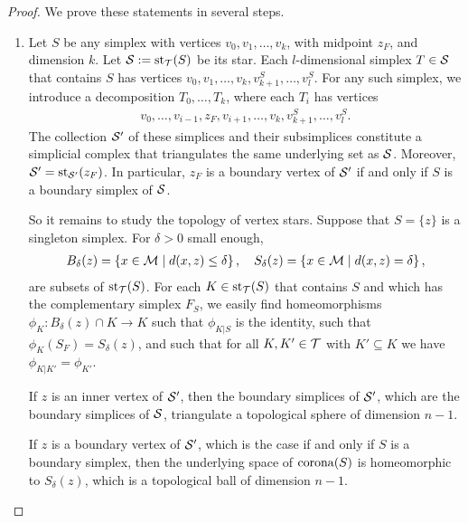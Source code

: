 \documentclass[a4paper]{article}
\begin{document}
\begin{proof}
    We prove these statements in several steps.
    \begin{enumerate}
    \item 
    Let $S$ be any simplex with vertices $v_0, v_1, \dots, v_k$, with midpoint $z_F$, and dimension $k$.
    Let ${\mathcal S} := \operatorname{st}_{{\mathcal T}}(S)$ be its star. 
    Each $l$-dimensional simplex $T \in {\mathcal S}$ that contains $S$ 
    has vertices $v_0, v_1, \dots, v_k, v_{k+1}^{S}, \dots, v_{l}^{S}$. 
    For any such simplex, we introduce a decomposition $T_{0}, \dots, T_{k}$, where each $T_{i}$ has vertices 
    \begin{align*}
        v_0, \dots, v_{i-1}, z_F, v_{i+1}, \dots, v_k, v_{k+1}^{S}, \dots, v_{l}^{S}.
    \end{align*}
    The collection ${\mathcal S}'$ of these simplices and their subsimplices constitute a simplicial complex 
    that triangulates the same underlying set as ${\mathcal S}$.
    Moreover, ${\mathcal S}' = \operatorname{st}_{{\mathcal S}'}(z_F)$. 
    In particular, $z_F$ is a boundary vertex of ${\mathcal S}'$ if and only if $S$ is a boundary simplex of ${\mathcal S}$. 
    
    So it remains to study the topology of vertex stars. Suppose that $S = \{z\}$ is a singleton simplex. 
    For $\delta > 0$ small enough, 
    \begin{align*}
        B_{\delta}(z) = \left\{ x \in \calM \suchthat d(x,z) \leq \delta \right\},
        \quad 
        S_{\delta}(z) = \left\{ x \in \calM \suchthat d(x,z) = \delta \right\},
    \end{align*}
    are subsets of $\operatorname{st}_{{\mathcal T}}(S)$.
    For each $K \in \operatorname{st}_{{\mathcal T}}(S)$ that contains $S$ and which has the complementary simplex $F_S$, 
    we easily find homeomorphisms $\phi_{K} : B_{\delta}(z) \cap K \rightarrow K$
    such that 
    $\phi_{K|S}$ is the identity,
    such that 
    $\phi_{K}(S_F) = S_{\delta}(z)$,
    and such that 
    for all $K, K' \in {\mathcal T}$ with $K' \subseteq K$ we have $\phi_{K|K'} = \phi_{K'}$. 
    
    If $z$ is an inner vertex of ${\mathcal S}'$, 
    then the boundary simplices of ${\mathcal S}'$,
    which are the boundary simplices of ${\mathcal S}$, triangulate a topological sphere of dimension $n-1$.
    
    If $z$ is a boundary vertex of ${\mathcal S}'$,
    which is the case if and only if $S$ is a boundary simplex, 
    then the underlying space of $\operatorname*{{\rm corona}}(S)$ is homeomorphic to $S_{\delta}(z)$, 
    which is a topological ball of dimension $n-1$. %
    

\end{enumerate}
\end{proof}
\end{document}
